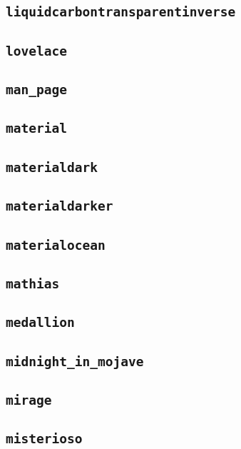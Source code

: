 \subsection{\texttt{liquidcarbontransparentinverse}}
\newpage
\subsection{\texttt{lovelace}}
\newpage
\subsection{\texttt{man\_page}}
\newpage
\subsection{\texttt{material}}
\newpage
\subsection{\texttt{materialdark}}
\newpage
\subsection{\texttt{materialdarker}}
\newpage
\subsection{\texttt{materialocean}}
\newpage
\subsection{\texttt{mathias}}
\newpage
\subsection{\texttt{medallion}}
\newpage
\subsection{\texttt{midnight\_in\_mojave}}
\newpage
\subsection{\texttt{mirage}}
\newpage
\subsection{\texttt{misterioso}}
\newpage
